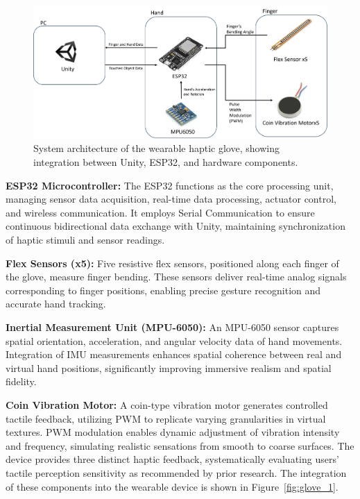 \documentclass[graybox]{svmult}
\begin{document}
\begin{figure}\centering
	\includegraphics[width=1\textwidth]{figure/system diagram.png}%
	\caption{System architecture of the wearable haptic glove, showing integration between Unity, ESP32, and hardware components.}\label{fig:system_diagram}
\end{figure}
\textbf{ESP32 Microcontroller:}
The ESP32 functions as the core processing unit, managing sensor data acquisition, real-time data processing, actuator control, and wireless communication. It employs Serial Communication to ensure continuous bidirectional data exchange with Unity, maintaining synchronization of haptic stimuli and sensor readings.

\textbf{Flex Sensors (x5):}
Five resistive flex sensors, positioned along each finger of the glove, measure finger bending. These sensors deliver real-time analog signals corresponding to finger positions, enabling precise gesture recognition and accurate hand tracking.

\textbf{Inertial Measurement Unit (MPU-6050):}
An MPU-6050 sensor captures spatial orientation, acceleration, and angular velocity data of hand movements. Integration of IMU measurements enhances spatial coherence between real and virtual hand positions, significantly improving immersive realism and spatial fidelity.

\textbf{Coin Vibration Motor:}
A coin-type vibration motor generates controlled tactile feedback, utilizing PWM to replicate varying granularities in virtual textures. PWM modulation enables dynamic adjustment of vibration intensity and frequency, simulating realistic sensations from smooth to coarse surfaces. The device provides three distinct haptic feedback, systematically evaluating users' tactile perception sensitivity as recommended by prior research. The integration of these components into the wearable device is shown in Figure~\ref{fig:glove_1}.
\end{document}
